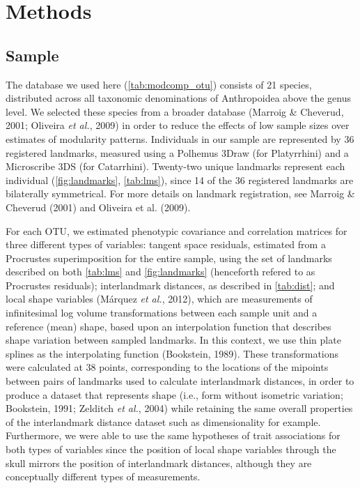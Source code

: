 \documentclass[12pt,twoside]{report}
\begin{document}
\section{Methods}\label{methods}

\subsection{Sample}\label{sample}

The database we used here (\autoref{tab:modcomp_otu}) consists of 21
species, distributed across all taxonomic denominations of Anthropoidea
above the genus level. We selected these species from a broader database
(Marroig \& Cheverud, 2001; Oliveira \emph{et al.}, 2009) in order to
reduce the effects of low sample sizes over estimates of modularity
patterns. Individuals in our sample are represented by 36 registered
landmarks, measured using a Polhemus 3Draw (for Platyrrhini) and a
Microscribe 3DS (for Catarrhini). Twenty-two unique landmarks represent
each individual (\autoref{fig:landmarks}, \autoref{tab:lms}), since 14
of the 36 registered landmarks are bilaterally symmetrical. For more
details on landmark registration, see Marroig \& Cheverud (2001) and
Oliveira et al. (2009).



For each OTU, we estimated phenotypic covariance and correlation
matrices for three different types of variables: tangent space
residuals, estimated from a Procrustes superimposition for the entire
sample, using the set of landmarks described on both \autoref{tab:lms}
and \autoref{fig:landmarks} (henceforth refered to as Procrustes
residuals); interlandmark distances, as described in \autoref{tab:dist};
and local shape variables (Márquez \emph{et al.}, 2012), which are
measurements of infinitesimal log volume transformations between each
sample unit and a reference (mean) shape, based upon an interpolation
function that describes shape variation between sampled landmarks. In
this context, we use thin plate splines as the interpolating function
(Bookstein, 1989). These transformations were calculated at 38 points,
corresponding to the locations of the mipoints between pairs of
landmarks used to calculate interlandmark distances, in order to produce
a dataset that represents shape (i.e., form without isometric variation;
Bookstein, 1991; Zelditch \emph{et al.}, 2004) while retaining the same
overall properties of the interlandmark distance dataset such as
dimensionality for example. Furthermore, we were able to use the same
hypotheses of trait associations for both types of variables since the
position of local shape variables through the skull mirrors the position
of interlandmark distances, although they are conceptually different
types of measurements.
\end{document}
